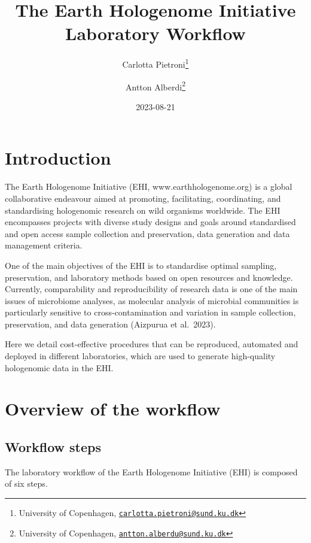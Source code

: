 \documentclass[
]{book}
\title{The Earth Hologenome Initiative Laboratory Workflow}
\author{Carlotta Pietroni\footnote{University of Copenhagen, \href{mailto:carlotta.pietroni@sund.ku.dk}{\nolinkurl{carlotta.pietroni@sund.ku.dk}}} \and Antton Alberdi\footnote{University of Copenhagen, \href{mailto:antton.alberdu@sund.ku.dk}{\nolinkurl{antton.alberdu@sund.ku.dk}}}}
\date{2023-08-21}
\begin{document}
\maketitle

{
\setcounter{tocdepth}{1}
\tableofcontents
}
\hypertarget{introduction}{%
\chapter{Introduction}\label{introduction}}

The Earth Hologenome Initiative (EHI, www.earthhologenome.org) is a global collaborative endeavour aimed at promoting, facilitating, coordinating, and standardising hologenomic research on wild organisms worldwide. The EHI encompasses projects with diverse study designs and goals around standardised and open access sample collection and preservation, data generation and data management criteria.

One of the main objectives of the EHI is to standardise optimal sampling, preservation, and laboratory methods based on open resources and knowledge. Currently, comparability and reproducibility of research data is one of the main issues of microbiome analyses, as molecular analysis of microbial communities is particularly sensitive to cross-contamination and variation in sample collection, preservation, and data generation (Aizpurua et al.~2023).

Here we detail cost-effective procedures that can be reproduced, automated and deployed in different laboratories, which are used to generate high-quality hologenomic data in the EHI.

\hypertarget{overview-of-the-workflow}{%
\chapter{Overview of the workflow}\label{overview-of-the-workflow}}

\hypertarget{workflow-steps}{%
\section{Workflow steps}\label{workflow-steps}}

The laboratory workflow of the Earth Hologenome Initiative (EHI) is composed of six steps.
\end{document}

